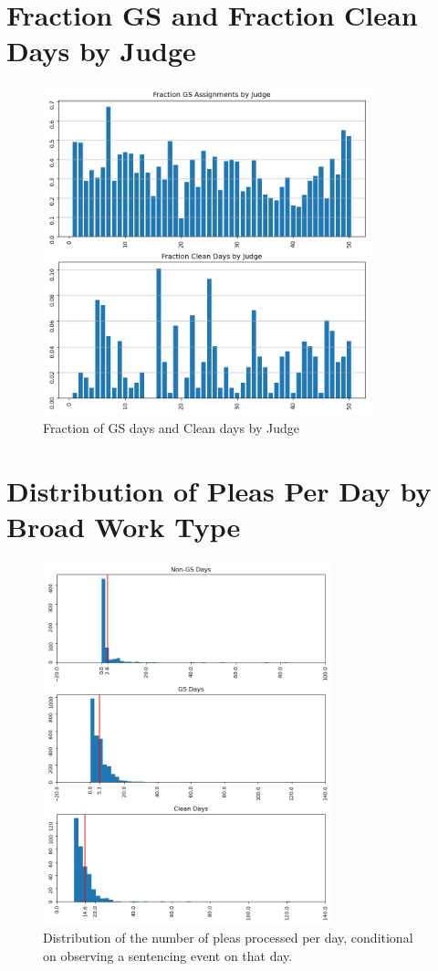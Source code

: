 \documentclass[11pt]{article}
\begin{document}
\section{Fraction GS and Fraction Clean Days by Judge}
  \begin{figure}[H]
    \centering
    \includegraphics[width=0.85\textwidth]{../../../output/figures/Exploration/fraction_gs_clean.png}
    \caption{Fraction of GS days and Clean days by Judge}
  \end{figure}

\section{Distribution of Pleas Per Day by Broad Work Type}
  \begin{figure}[H]
    \centering
    \includegraphics[width=0.75\textwidth]{../../../output/figures/Exploration/daily_plea_hist_by_broad_work_type.png}
    \caption{Distribution of the number of pleas processed per day, conditional on observing a sentencing event on that day.}
  \end{figure}
\end{document}
